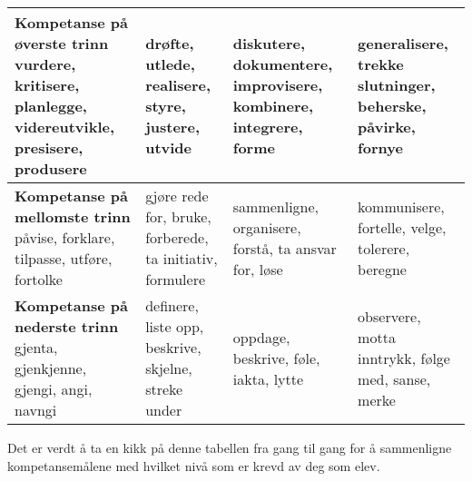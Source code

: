 \documentclass[main.tex]{subfiles}
\begin{document}
\begin{center}
\begin{tabular}{ | m{6cm} | m{6cm}| m{6cm} | m{6cm}} 
\hline
\textbf{Kompetanse på øverste trinn} vurdere, kritisere, planlegge, videreutvikle, presisere, produsere & drøfte, utlede, realisere, styre, justere, utvide & diskutere, dokumentere, improvisere, kombinere, integrere, forme & generalisere, trekke slutninger, beherske, påvirke, fornye\\ 
\hline
\textbf{Kompetanse på mellomste trinn} påvise, forklare, tilpasse, utføre, fortolke & gjøre rede for, bruke, forberede, ta initiativ, formulere & sammenligne, organisere, forstå, ta ansvar for, løse & kommunisere, fortelle, velge, tolerere, beregne \\ 
\hline
\textbf{Kompetanse på nederste trinn} gjenta, gjenkjenne, gjengi, angi, navngi & definere, liste opp, beskrive, skjelne, streke under & oppdage, beskrive, føle, iakta, lytte & observere, motta inntrykk, følge med, sanse, merke\\ 
\hline
\end{tabular}
\end{center}
Det er verdt å ta en kikk på denne tabellen fra gang til gang for å sammenligne kompetansemålene med hvilket nivå som er krevd av deg som elev.
\end{document}
